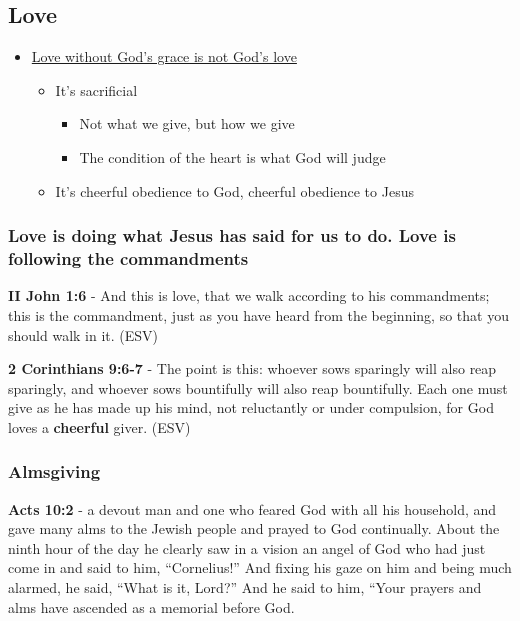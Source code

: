 \documentclass[11pt]{article}
\begin{document}
\subsection{Love}
\label{sec:orgacbc102}
\begin{itemize}
\item \href{https://www.youtube.com/watch?v=d2FKSxaa76w\&ab\_channel=FatherSpyridon}{Love without God's grace is not God's love}
\begin{itemize}
\item It's sacrificial
\begin{itemize}
\item Not what we give, but how we give
\item The condition of the heart is what God will judge
\end{itemize}
\item It's cheerful obedience to God, cheerful obedience to Jesus
\end{itemize}
\end{itemize}

\subsubsection{Love is doing what Jesus has said for us to do. Love is following the commandments}
\label{sec:org7590400}
\textbf{II John 1:6} - And this is love, that we walk according to his commandments; this is the commandment, just as you have heard from the beginning, so that you should walk in it. (ESV)

\textbf{2 Corinthians 9:6-7} - The point is this: whoever sows sparingly will also reap sparingly, and whoever sows bountifully will also reap bountifully.  Each one must give as he has made up his mind, not reluctantly or under compulsion, for God loves a \textbf{cheerful} giver.  (ESV)

\subsubsection{Almsgiving}
\label{sec:orgba8ffcc}
\textbf{Acts 10:2} - a devout man and one who feared God with all his household, and gave many alms to the Jewish people and prayed to God continually.  About the ninth hour of the day he clearly saw in a vision an angel of God who had just come in and said to him, “Cornelius!” And fixing his gaze on him and being much alarmed, he said, “What is it, Lord?” And he said to him, “Your prayers and alms have ascended as a memorial before God.
\end{document}
